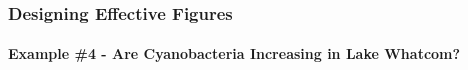 \documentclass[10pt]{beamer}
\begin{document}
\begin{frame}
\frametitle{Designing Effective Figures}
\framesubtitle{Example \#4 - Are Cyanobacteria Increasing in Lake Whatcom?}

\vspace*{-0.15in}
\begin{center}
\end{center} 
\end{frame}
\end{document}
